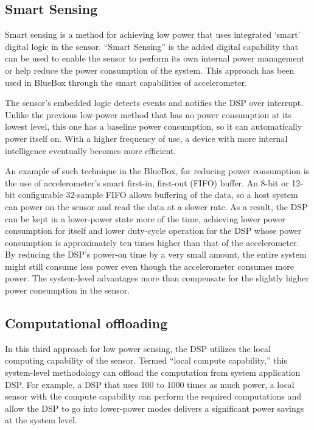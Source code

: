  \subsection{Smart Sensing}

Smart sensing is a method for achieving low power that uses
integrated `smart' digital logic in the sensor. ``Smart Sensing'' is
the added digital capability that can be used to enable the sensor to
perform its own internal power management or help reduce the power
consumption of the system. This approach has been used in BlueBox
through the smart capabilities of accelerometer.
 
The sensor's embedded logic detects events and notifies the DSP over
interrupt. Unlike the previous low-power method that has no power
consumption at its lowest level, this one has a baseline power
consumption, so it can automatically power itself on. With a higher
frequency of use, a device with more internal intelligence eventually
becomes more efficient. 
 
An example of such technique in the BlueBox, for reducing power
consumption is the use of accelerometer’s smart first-in, first-out
(FIFO) buffer. An 8-bit or 12-bit configurable 32-sample FIFO allows
buffering of the data, so a host system can power on the sensor and
read the data at a slower rate. As a result, the DSP can be kept in a
lower-power state more of the time, achieving lower power consumption
for itself and lower duty-cycle operation for the DSP whose power
consumption is approximately ten times higher than that of the
accelerometer. By reducing the DSP’s power-on time by a very small
amount, the entire system might still consume less power even though
the accelerometer consumes more power. The system-level advantages
more than compensate for the slightly higher power consumption in the
sensor. 
 
 \subsection{Computational offloading}

 In this third approach for low power sensing, the DSP utilizes the
 local computing capability of the sensor. Termed ``local compute
 capability,'' this system-level methodology can offload the
 computation from system application DSP. For example, a DSP that
 uses 100 to 1000 times as much power, a local sensor with the
 compute capability can perform the required computations and allow
 the DSP to go into lower-power modes delivers a significant power
 savings at the system level.
 
